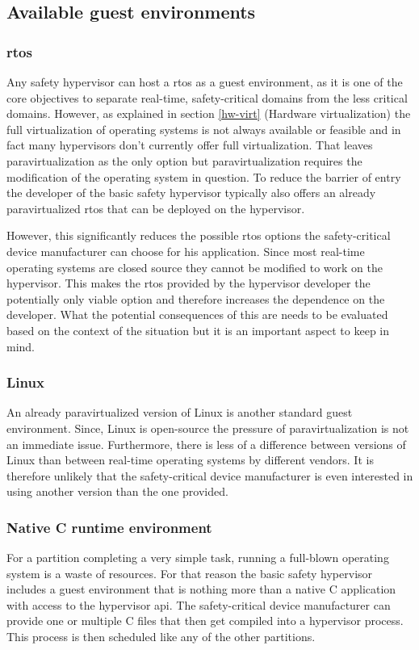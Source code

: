 \subsection{Available guest environments}
\subsubsection{\acrshort{rtos}}
Any safety hypervisor can host a \acrlong{rtos} as a guest environment, as it is one of the core objectives to separate real-time, safety-critical domains from the less critical domains. However, as explained in section \ref{hw-virt} (Hardware virtualization) the full virtualization of operating systems is not always available or feasible and in fact many hypervisors don't currently offer full virtualization. That leaves paravirtualization as the only option but paravirtualization requires the modification of the operating system in question. To reduce the barrier of entry the developer of the basic safety hypervisor typically also offers an already paravirtualized \acrshort{rtos} that can be deployed on the hypervisor. 

However, this significantly reduces the possible \acrshort{rtos} options the safety-critical device manufacturer can choose for his application. Since most real-time operating systems are closed source they cannot be modified to work on the hypervisor. This makes the \acrshort{rtos} provided by the hypervisor developer the potentially only viable option and therefore increases the dependence on the developer. What the potential consequences of this are needs to be evaluated based on the context of the situation but it is an important aspect to keep in mind.

\subsubsection{Linux}
An already paravirtualized version of Linux is another standard guest environment. Since, Linux is open-source the pressure of paravirtualization is not an immediate issue. Furthermore, there is less of a difference between versions of Linux than between real-time operating systems by different vendors. It is therefore unlikely that the safety-critical device manufacturer is even interested in using another version than the one provided.

\subsubsection{Native C runtime environment}
For a partition completing a very simple task, running a full-blown operating system is a waste of resources. For that reason the basic safety hypervisor includes a guest environment that is nothing more than a native C application with access to the hypervisor \acrshort{api}. The safety-critical device manufacturer can provide one or multiple C files that then get compiled into a hypervisor process. This process is then scheduled like any of the other partitions.

